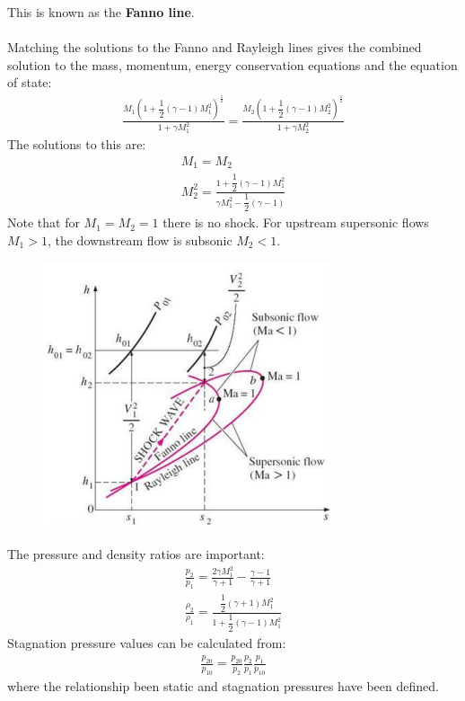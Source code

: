 \documentclass[class=report, crop=false, 12pt,a4paper]{standalone}
\begin{document}
This is known as the \textbf{Fanno line}. 
\\\\
Matching the solutions to the Fanno and Rayleigh lines gives the combined solution to the mass, momentum, energy conservation equations and the equation of state: 
\begin{gather}
   \frac{M_1 \left( 1+\dfrac{1}{2}(\gamma-1)M_1^2 \right)^{\frac{1}{2}}}{1+\gamma M_1^2} = \frac{M_2 \left( 1+\dfrac{1}{2}(\gamma-1)M_2^2 \right)^{\frac{1}{2}}}{1+\gamma M_2^2}
\end{gather}
The solutions to this are: 
\begin{gather}
    M_1 = M_2 \\[5pt]
    M_2^2 = \frac{1+\dfrac{1}{2}(\gamma-1)M_1^2}{\gamma M_1^2 - \dfrac{1}{2}(\gamma-1)}
\end{gather}
Note that for $M_1 = M_2 = 1$ there is no shock. For upstream supersonic flows $M_1>1$, the downstream flow is subsonic $M_2<1$. 
\begin{figure}[H]
    \centering
    \includegraphics[width = 0.55 \textwidth]{../img/diagram6.PNG} 
    \caption{}
\end{figure}
The pressure and density ratios are important: 
\begin{gather}
    \frac{p_2}{p_1} = \frac{2\gamma M_1^2}{\gamma+1}-\frac{\gamma-1}{\gamma+1} \\[5pt]
    \frac{\rho_2}{\rho_1} = \frac{\dfrac{1}{2}(\gamma+1)M_1^2}{1+\dfrac{1}{2}(\gamma-1)M_1^2}
\end{gather}
Stagnation pressure values can be calculated from: 
\begin{gather}
    \frac{p_{20}}{p_{10}} = \frac{p_{20}}{p_{2}}\frac{p_2}{p_1}\frac{p_1}{p_{10}}
\end{gather}
where the relationship been static and stagnation pressures have been defined. 
\end{document}
